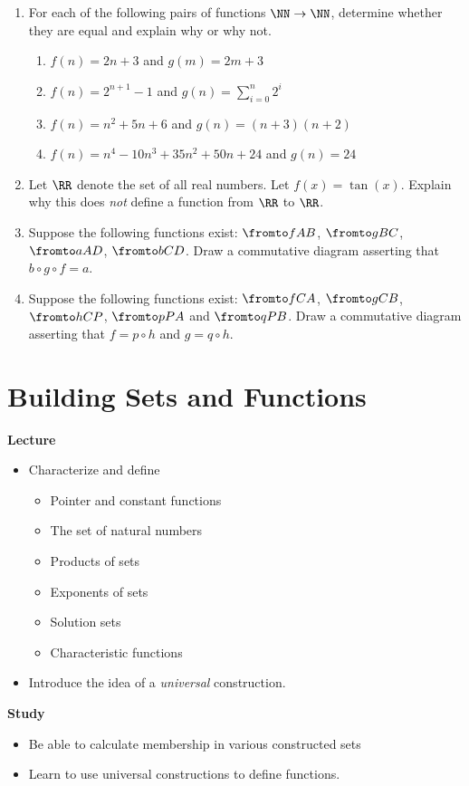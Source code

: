 \begin{exercises}
\begin{enumerate}
\item  For each of the following pairs of functions $\NN\to\NN$, determine whether they are equal and explain why or why not.
  \begin{enumerate}
  \item $f(n) = 2n + 3$ and $g(m) = 2m + 3$
  \item $f(n) = 2^{n+1} - 1$ and $g(n) = \sum_{i=0}^n2^i$
  \item $f(n) =  n^2 + 5n + 6$ and $g(n) = (n+3)(n+2)$
  \item $f(n) = n^4 - 10n^3 + 35n^2 + 50n + 24$ and $g(n) = 24$
  \end{enumerate}
\item Let $\RR$ denote the set of all real numbers. Let $f(x) = \tan(x)$.
Explain why this does \emph{not} define a function from $\RR$ to $\RR$.
\item Suppose the following functions exist: $\fromto fAB$, $\fromto gBC$, $\fromto aAD$, $\fromto bCD$. 
  Draw a commutative diagram asserting that $b\circ g\circ f = a$.
\item Suppose the following functions exist: $\fromto fCA$, $\fromto gCB$, $\fromto hCP$, $\fromto pPA$ and $\fromto qPB$.
 Draw a commutative diagram asserting that $f=p\circ h$ and $g=q\circ h$.
\end{enumerate}
\end{exercises}

\chapter{Building Sets and Functions}

\begin{goals}
	\noindent\textbf{Lecture}
	\begin{itemize}
	\item Characterize and define
		 \begin{itemize}
			 \item Pointer and constant functions
		 	\item The set of natural numbers
			\item Products of sets
			\item Exponents of sets
			\item Solution sets
			\item Characteristic functions
		 \end{itemize}
	\item Introduce the idea of a \emph{universal} construction.
	\end{itemize}

	\noindent\textbf{Study}
	\begin{itemize}
	\item Be able to calculate membership in various constructed sets 
	\item Learn to use universal constructions to define functions. 
	\end{itemize}
\end{goals}

